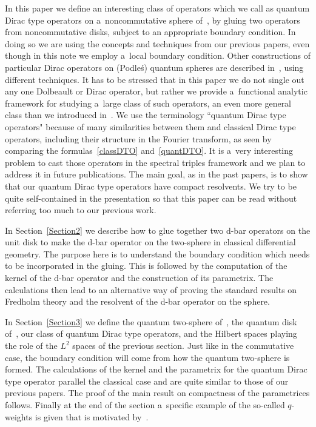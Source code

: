 \documentclass[pdftex]{sigma}
\numberwithin{equation}{section}
\begin{document}
In this paper we def\/ine an interesting class of operators which we call as quantum Dirac type operators on
a~noncommutative sphere of~\cite{HMS}, by gluing two operators from noncommutative disks, subject to an appropriate
boundary condition.
In doing so we are using the concepts and techniques from our previous papers, even though in this note we employ
a~local boundary condition.
Other constructions of particular Dirac operators on (Podle\'s) quantum spheres are described
in~\cite{BL,DLPS,DS,DDLW}, using dif\/ferent techniques.
It has to be stressed that in this paper we do not single out any one Dolbeault or Dirac operator, but rather we provide
a~functional analytic framework for studying a~large class of such operators, an even more general class than we
introduced in~\cite{KM5}.
We use the terminology ``quantum Dirac type operators" because of many similarities between them and classical Dirac
type operators, including their structure in the Fourier transform, as seen by comparing the formulas~\eqref{classDTO}
and~\eqref{quantDTO}.
It is a~very interesting problem to cast those operators in the spectral triples framework and we plan to address it in
future publications.
The main goal, as in the past papers, is to show that our quantum Dirac type operators have compact resolvents.
We try to be quite self-contained in the presentation so that this paper can be read without referring too much to our
previous work.

In Section~\ref{Section2} we describe how to glue together two d-bar operators on the unit disk to make the d-bar operator on the
two-sphere in classical dif\/ferential geometry.
The purpose here is to understand the boundary condition which needs to be incorporated in the gluing.
This is followed by the computation of the kernel of the d-bar operator and the construction of its parametrix.
The calculations then lead to an alternative way of proving the standard results on Fredholm theory and the resolvent of
the d-bar operator on the sphere.

In Section~\ref{Section3} we def\/ine the quantum two-sphere of~\cite{HMS}, the quantum disk of~\cite{KL}, our class of quantum Dirac
type operators, and the Hilbert spaces playing the role of the $L^2$ spaces of the previous section.
Just like in the commutative case, the boundary condition will come from how the quantum two-sphere is formed.
The calculations of the kernel and the parametrix for the quantum Dirac type operator parallel the classical case and
are quite similar to those of our previous papers.
The proof of the main result on compactness of the parametrices follows.
Finally at the end of the section a~specif\/ic example of the so-called $q$-weights is given that is motivated
by~\cite{KM1}.
\end{document}
